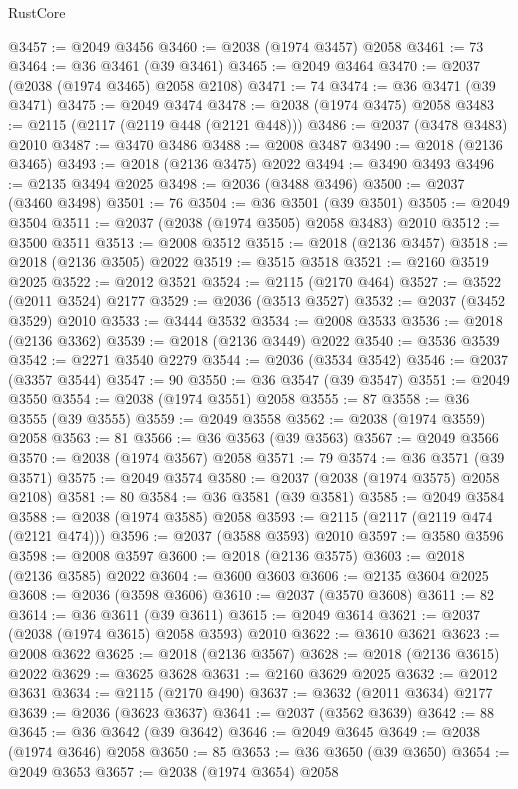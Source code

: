 \begin{lexlean}{RustCore}
\begin{coremodule}
@3457 := @2049 @3456
@3460 := @2038 (@1974 @3457) @2058
@3461 := 73
@3464 := @36 @3461 (@39 @3461)
@3465 := @2049 @3464
@3470 := @2037 (@2038 (@1974 @3465) @2058 @2108)
@3471 := 74
@3474 := @36 @3471 (@39 @3471)
@3475 := @2049 @3474
@3478 := @2038 (@1974 @3475) @2058
@3483 := @2115 (@2117 (@2119 @448 (@2121 @448)))
@3486 := @2037 (@3478 @3483) @2010
@3487 := @3470 @3486
@3488 := @2008 @3487
@3490 := @2018 (@2136 @3465)
@3493 := @2018 (@2136 @3475) @2022
@3494 := @3490 @3493
@3496 := @2135 @3494 @2025
@3498 := @2036 (@3488 @3496)
@3500 := @2037 (@3460 @3498)
@3501 := 76
@3504 := @36 @3501 (@39 @3501)
@3505 := @2049 @3504
@3511 := @2037 (@2038 (@1974 @3505) @2058 @3483) @2010
@3512 := @3500 @3511
@3513 := @2008 @3512
@3515 := @2018 (@2136 @3457)
@3518 := @2018 (@2136 @3505) @2022
@3519 := @3515 @3518
@3521 := @2160 @3519 @2025
@3522 := @2012 @3521
@3524 := @2115 (@2170 @464)
@3527 := @3522 (@2011 @3524) @2177
@3529 := @2036 (@3513 @3527)
@3532 := @2037 (@3452 @3529) @2010
@3533 := @3444 @3532
@3534 := @2008 @3533
@3536 := @2018 (@2136 @3362)
@3539 := @2018 (@2136 @3449) @2022
@3540 := @3536 @3539
@3542 := @2271 @3540 @2279
@3544 := @2036 (@3534 @3542)
@3546 := @2037 (@3357 @3544)
@3547 := 90
@3550 := @36 @3547 (@39 @3547)
@3551 := @2049 @3550
@3554 := @2038 (@1974 @3551) @2058
@3555 := 87
@3558 := @36 @3555 (@39 @3555)
@3559 := @2049 @3558
@3562 := @2038 (@1974 @3559) @2058
@3563 := 81
@3566 := @36 @3563 (@39 @3563)
@3567 := @2049 @3566
@3570 := @2038 (@1974 @3567) @2058
@3571 := 79
@3574 := @36 @3571 (@39 @3571)
@3575 := @2049 @3574
@3580 := @2037 (@2038 (@1974 @3575) @2058 @2108)
@3581 := 80
@3584 := @36 @3581 (@39 @3581)
@3585 := @2049 @3584
@3588 := @2038 (@1974 @3585) @2058
@3593 := @2115 (@2117 (@2119 @474 (@2121 @474)))
@3596 := @2037 (@3588 @3593) @2010
@3597 := @3580 @3596
@3598 := @2008 @3597
@3600 := @2018 (@2136 @3575)
@3603 := @2018 (@2136 @3585) @2022
@3604 := @3600 @3603
@3606 := @2135 @3604 @2025
@3608 := @2036 (@3598 @3606)
@3610 := @2037 (@3570 @3608)
@3611 := 82
@3614 := @36 @3611 (@39 @3611)
@3615 := @2049 @3614
@3621 := @2037 (@2038 (@1974 @3615) @2058 @3593) @2010
@3622 := @3610 @3621
@3623 := @2008 @3622
@3625 := @2018 (@2136 @3567)
@3628 := @2018 (@2136 @3615) @2022
@3629 := @3625 @3628
@3631 := @2160 @3629 @2025
@3632 := @2012 @3631
@3634 := @2115 (@2170 @490)
@3637 := @3632 (@2011 @3634) @2177
@3639 := @2036 (@3623 @3637)
@3641 := @2037 (@3562 @3639)
@3642 := 88
@3645 := @36 @3642 (@39 @3642)
@3646 := @2049 @3645
@3649 := @2038 (@1974 @3646) @2058
@3650 := 85
@3653 := @36 @3650 (@39 @3650)
@3654 := @2049 @3653
@3657 := @2038 (@1974 @3654) @2058

\end{coremodule}
\end{lexlean}
